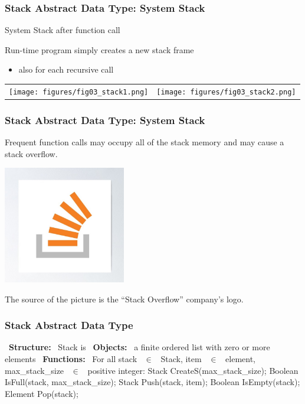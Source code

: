 \documentclass[newPxFont,sthlmFooter,nooffset]{beamer}
\begin{document}
\begin{frame}[t]
  \frametitle{Stack Abstract Data Type: System Stack}
System Stack after function call

{ Run-time program simply creates a new stack frame
  \begin{itemize}
  \item also for each recursive call
  \end{itemize}
}

  \begin{center}
    \begin{tabular}{!{}c<{}c}
      \texttt{[image: figures/fig03\_stack1.png]} &
      \texttt{[image: figures/fig03\_stack2.png]} \\
    \end{tabular}
  \end{center}

\end{frame}
\begin{frame}[t]
	\frametitle{Stack Abstract Data Type: System Stack}
	Frequent function calls may occupy all of the stack memory and may cause a stack overflow.
	\begin{center}
			\includegraphics[width=0.4\textwidth]{figures/stackoverflow.png}
	\end{center}
\begin{tiny}
	\begin{flushright}
		The source of the picture is the ``Stack Overflow'' company's logo.
	\end{flushright}
\end{tiny}

\end{frame}


\begin{frame}[t,fragile]
  \frametitle{Stack Abstract Data Type}
\begin{codedef}
~\textbf{Structure:}~    Stack is 
   ~\textbf{Objects:}~ a finite ordered list with zero or more elements
   ~\textbf{Functions:}~
   For all stack ~$\in$~ Stack, 
   item ~$\in$~ element,
   max_stack_size ~$\in$~ positive integer:
       Stack CreateS(max_stack_size);
       Boolean IsFull(stack, max_stack_size);
       Stack Push(stack, item);
       Boolean IsEmpty(stack);
       Element Pop(stack); 
\end{codedef}
\end{frame}
\end{document}
